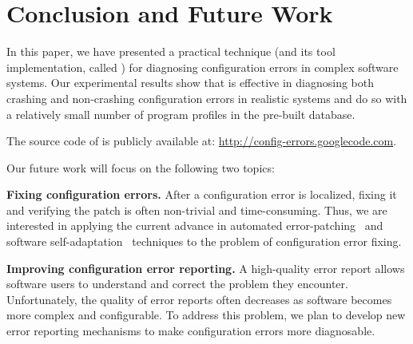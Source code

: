 \section{Conclusion and Future Work}

In this paper, we have presented a practical technique (and
its tool implementation, called \ourtool) for diagnosing
configuration errors in complex software systems.
Our experimental results show that \ourtool is effective in
diagnosing both crashing and non-crashing configuration errors
in realistic systems and do so with a
relatively small number of program profiles in the pre-built database.

The source code of \ourtool is publicly available at:
\url{http://config-errors.googlecode.com}.

\vspace{1mm}

Our future
work will focus on the following two topics:

\textbf{Fixing configuration errors.} After a configuration error
is localized, fixing it and verifying the patch is
often non-trivial and time-consuming. Thus, we
are interested in applying the current advance in
automated error-patching~\cite{rangefix} and
software self-adaptation~\cite{Wang:2009:STR, Mori:2011:LSU} techniques to
the problem of configuration error fixing.


\textbf{Improving configuration error reporting.} A high-quality
error report allows software users to understand and correct the problem
they encounter. 
Unfortunately, the quality of error reports often
decreases as software becomes more complex and configurable.
To address this problem, we plan to develop new error reporting mechanisms
to make configuration errors
more diagnosable.









